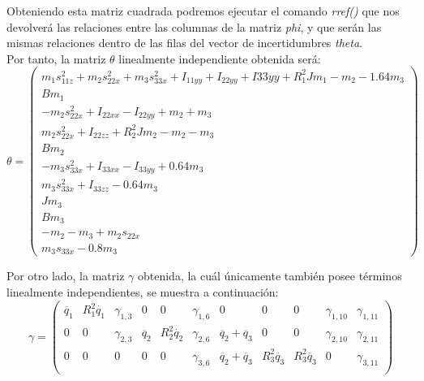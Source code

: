 		Obteniendo esta matriz cuadrada podremos ejecutar el comando \textit{rref()} que nos devolverá las relaciones entre las columnas de la matriz \textit{phi}, y que serán las mismas relaciones dentro de las filas del vector de incertidumbres \textit{theta}.\\

Por tanto, la matriz $\theta$ linealmente independiente obtenida será:
			\[
			\theta=
				\begin{pmatrix}
					  m_{1}s_{11z}^{2} + m_{2}s_{22x}^{2} + m_{3}s_{33x}^{2} + I_{11yy} + I_{22yy} + I{33yy} + R_{1}^{2}Jm_1 - m_2 - 1.64m_3 \\
					  Bm_{1}  \\
					  -m_{2}s_{22x}^{2} + I_{22xx} - I_{22yy} + m_{2} + m_{3} \\
					  m_{2}s_{22x}^{2} + I_{22zz} + R_{2}^{2}Jm_{2} - m_{2} - m_{3}  \\
					  Bm_{2} \\
					  - m_{3}s_{33x}^{2} + I_{33xx} - I_{33yy} + 0.64m_{3} \\
					  m_{3}s_{33x}^{2} + I_{33zz} - 0.64m_{3}  \\
					  Jm_{3}  \\
					  Bm_{3}  \\
					  -m_{2} -m_{3} + m_{2}s_{22x}  \\
					  m_{3}s_{33x} - 0.8m_{3}
				\end{pmatrix}
			\]

\vspace{1cm}
Por otro lado, la matriz $\gamma$ obtenida, la cuál únicamente también posee términos linealmente independientes, se muestra a continuación:
			\[
\gamma=
\begin{pmatrix}
\ddot{q_1} & R_{1}^{2}\dot{q_1} & \gamma_{1,3} & 0 & 0  & \gamma_{1,6} & 0 & 0 & 0 & \gamma_{1,10} & \gamma_{1,11} \\
0 & 0 & \gamma_{2,3} & \ddot{q_2} & R_{2}^{2}\dot{q_2} & \gamma_{2,6} & \ddot{q_2} + \ddot{q_3} & 0 & 0 & \gamma_{2,10} & \gamma_{2,11} \\
0 & 0 & 0 & 0 & 0 & \gamma_{3,6} & \ddot{q_2} + \ddot{q_3} & R_{3}^{2}\ddot{q_3} & R_{3}^{2}\ddot{q_3} & 0 & \gamma_{3,11} \\
\end{pmatrix} \] \vspace{0.3cm}

